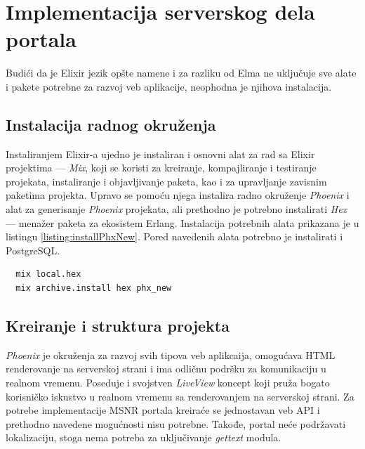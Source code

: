 \documentclass[12pt,oneside]{memoir}
\begin{document}
\chapter{Implementacija serverskog dela portala}

Budići da je Elixir jezik opšte namene i za razliku od Elma ne uključuje sve alate i pakete
potrebne za razvoj veb aplikacije, neophodna je njihova instalacija.

\section{Instalacija radnog okruženja}
Instaliranjem Elixir-a ujedno je instaliran i osnovni alat za rad sa Elixir projektima --- \emph{Mix}, koji se koristi za
kreiranje, kompajliranje i testiranje projekata, instaliranje i objavljivanje paketa, kao i za upravljanje zavisnim paketima projekta.
Upravo se pomoću njega instalira radno okruženje \emph{Phoenix} i alat za generisanje \emph{Phoenix} projekata, ali prethodno je potrebno instalirati
\emph{Hex} --- menažer paketa za ekosistem Erlang. Instalacija potrebnih alata prikazana je u listingu \ref{listing:installPhxNew}.
Pored navedenih alata potrebno je instalirati i PostgreSQL.

\begin{listing}[h]
\begin{verbatim}
  mix local.hex
  mix archive.install hex phx_new
\end{verbatim}
\caption{Instalacija alata \emph{hex} i \emph{phx{\textunderscore}new}}
\label{listing:installPhxNew}
\end{listing}

\section{Kreiranje i struktura projekta}
\emph{Phoenix} je okruženja za razvoj svih tipova veb aplikcaija, omogućava HTML renderovanje na serverskoj strani i ima odličnu podršku
za komunikaciju u realnom vremenu. Poseduje i svojstven \emph{LiveView} koncept koji pruža bogato korisničko iskustvo u realnom vremenu sa
renderovanjem na serverskoj strani. Za potrebe implementacije MSNR portala kreiraće se jednostavan veb API i prethodno navedene mogućnosti nisu potrebne.
Takođe, portal neće podržavati lokalizaciju, stoga nema potreba za uključivanje \emph{gettext} modula.
\end{document}
